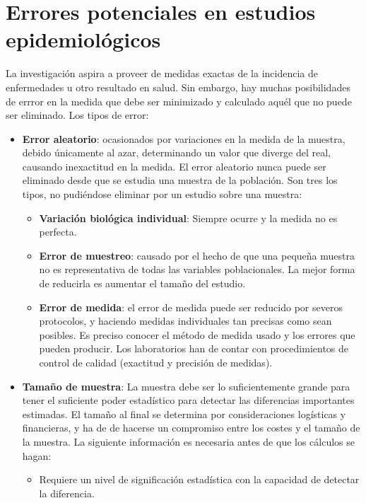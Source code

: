 \section{Errores potenciales en estudios epidemiológicos}
La investigación  aspira a proveer de medidas exactas de la incidencia de enfermedades u otro resultado en salud. Sin embargo, hay muchas posibilidades de errror en la medida que debe ser minimizado y calculado aquél que no puede ser eliminado. Los tipos de error:
\begin{itemize}[itemsep=0pt,parsep=0pt,topsep=0pt,partopsep=0pt]
	\item \textbf{Error aleatorio}: ocasionados por variaciones en la medida de la muestra, debido únicamente al azar, determinando un valor que diverge del real, causando inexactitud en la medida. El error aleatorio nunca puede ser eliminado desde que se estudia una muestra de la población. Son tres los tipos, no pudiéndose eliminar por un estudio sobre una muestra:
	\begin{itemize}[itemsep=0pt,parsep=0pt,topsep=0pt,partopsep=0pt]
		\item \textbf{Variación biológica individual}: Siempre ocurre y la medida no es perfecta.
		\item\textbf{Error de muestreo}: causado por el hecho de que una pequeña muestra no es representativa de todas las variables poblacionales. La mejor forma de reducirla es aumentar el tamaño del estudio.
		\item\textbf{Error de medida}: el error de medida puede ser reducido por severos protocolos, y haciendo medidas individuales tan precisas como sean posibles. Es preciso conocer el método de medida usado y los errores que pueden producir. Los laboratorios han de contar con procedimientos de control de calidad (exactitud y precisión de medidas).
	\end{itemize}
	\item\textbf{Tamaño de muestra}: La muestra debe ser lo suficientemente grande para tener el suficiente poder estadístico para detectar las diferencias importantes estimadas. El tamaño al final se determina por consideraciones logísticas y financieras, y ha de de hacerse un compromiso entre los costes y el tamaño de la muestra. La siguiente información es necesaria antes de que los cálculos se hagan:
	\begin{itemize}[itemsep=0pt,parsep=0pt,topsep=0pt,partopsep=0pt]
		\item Requiere un nivel de significación estadística con la capacidad de detectar la diferencia.

\end{itemize}
\end{itemize}
